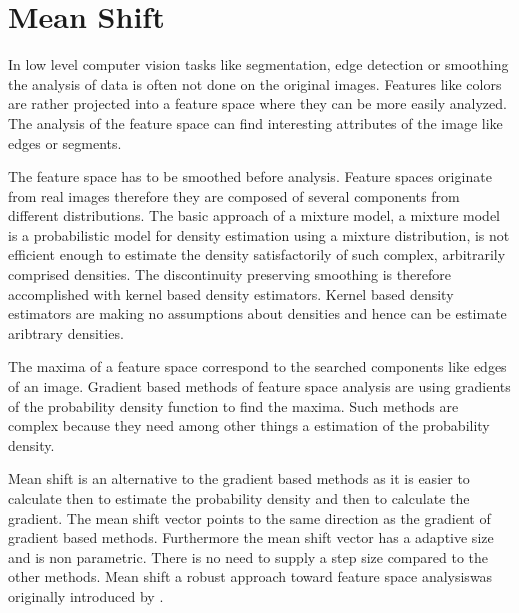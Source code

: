 \chapter{Mean Shift}\label{ch:mean_shift}
In low level computer vision tasks like segmentation, edge detection or smoothing
the analysis of data is often not done on the original images. Features like 
colors are rather projected into a feature space where they can be more easily
analyzed. The analysis of the feature space can find interesting attributes of 
the image like edges or segments.

The feature space has to be smoothed before analysis. Feature spaces originate
from real images therefore they are composed of several components from
different distributions. The basic approach of a mixture model, a mixture model
is a probabilistic model for density estimation using a mixture distribution, is
not efficient enough to estimate the density satisfactorily of such complex,
arbitrarily comprised densities. The discontinuity preserving smoothing is therefore
accomplished with kernel based density estimators. Kernel based density estimators
are making no assumptions about densities and hence can be estimate aribtrary 
densities.

The maxima of a feature space correspond to the searched components like edges
of an image. Gradient based methods of feature space analysis are using gradients
of the probability density function to find the maxima. Such methods are complex
because they need among other things a estimation of the probability density.

Mean shift is an alternative to the gradient based methods as it is easier to 
calculate then to estimate the probability density and then to calculate the 
gradient. The mean shift vector points to the same direction as the gradient of
gradient based methods. Furthermore the mean shift vector has a adaptive size and
is non parametric. There is no need to supply a step size compared to the other
methods. Mean shift a robust approach toward feature space analysiswas
originally introduced by \citeauthor{citeulike:462300} \citep{citeulike:462300}.

